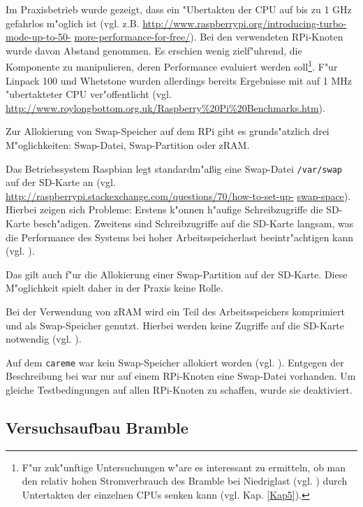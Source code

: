 Im Praxisbetrieb wurde gezeigt, dass ein "Ubertakten der CPU auf bis zu 1 GHz gefahrlos m"oglich ist (vgl. z.B. \url{http://www.raspberrypi.org/introducing-turbo-mode-up-to-50-} \url{more-performance-for-free/}). Bei den verwendeten RPi-Knoten wurde davon Abstand genommen. Es erschien wenig zielf"uhrend, die Komponente zu manipulieren, deren Performance evaluiert werden soll\footnote{F"ur zuk"unftige Untersuchungen w"are es interessant zu ermitteln, ob man den relativ hohen Stromverbrauch des Bramble bei Niedriglast (vgl. \cite{kli13}) durch Untertakten der einzelnen CPUs senken kann (vgl. Kap. \ref{Kap5}).}. F"ur Linpack 100 und Whetstone wurden allerdings bereits Ergebnisse mit auf 1 MHz "ubertakteter CPU ver"offentlicht (vgl. \url{http://www.roylongbottom.org.uk/Raspberry\%20Pi\%20Benchmarks.htm}).

Zur Allokierung von Swap-Speicher auf dem RPi gibt es grunds"atzlich drei M"oglichkeiten: Swap-Datei, Swap-Partition oder zRAM. 

\noindent
Das Betriebssystem Raspbian legt standardm"a\ss ig eine Swap-Datei \texttt{/var/swap} auf der SD-Karte an (vgl. \url{http://raspberrypi.stackexchange.com/questions/70/how-to-set-up-} \url{swap-space}). Hierbei zeigen sich Probleme: Erstens k"onnen h"aufige Schreibzugriffe die SD-Karte besch"adigen. Zweitens sind Schreibzugriffe auf die SD-Karte langsam, was die Performance des Systems bei hoher Arbeitsspeicherlast beeintr"achtigen kann (vgl. \cite{pow12}). 

Das gilt auch f"ur die Allokierung einer Swap-Partition auf der SD-Karte. Diese M"oglichkeit spielt daher in der Praxis keine Rolle. 

Bei der Verwendung von zRAM wird ein Teil des Arbeitsspeichers komprimiert und als Swap-Speicher genutzt. Hierbei werden keine Zugriffe auf die SD-Karte notwendig (vgl. \cite{pow12}). 

Auf dem \texttt{careme} war kein Swap-Speicher allokiert worden (vgl. \cite{kli13}). Entgegen der Beschreibung bei war nur auf einem RPi-Knoten eine Swap-Datei vorhanden. Um gleiche Testbedingungen auf allen RPi-Knoten zu schaffen, wurde sie deaktiviert. 

\subsection{Versuchsaufbau Bramble}\label{Bramble-Versuchsaufbau}

